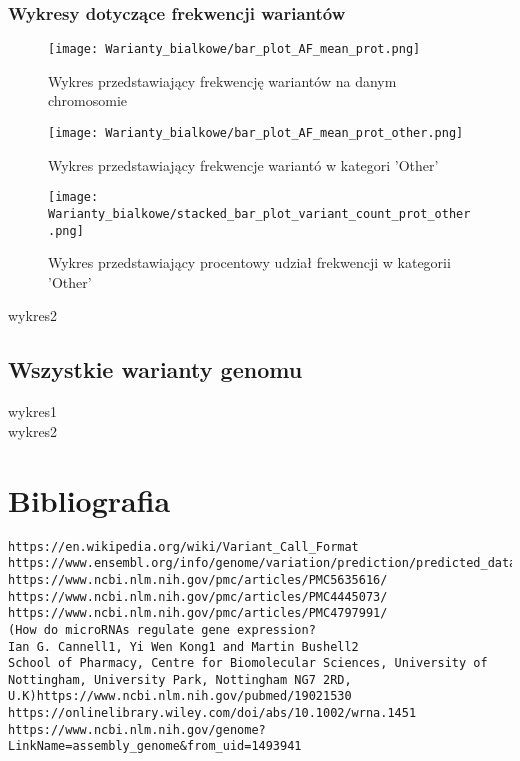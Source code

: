 \documentclass[12pt]{article}
\begin{document}
\subsubsection{Wykresy dotyczące frekwencji wariantów}
\begin{figure}[H]
    \texttt{[image: Warianty\_bialkowe/bar\_plot\_AF\_mean\_prot.png]}
    \caption{Wykres przedstawiający frekwencję wariantów na danym chromosomie}
\end{figure}
\begin{figure}[H]
    \texttt{[image: Warianty\_bialkowe/bar\_plot\_AF\_mean\_prot\_other.png]}
    \caption{Wykres przedstawiający frekwencje wariantó w kategori 'Other'}
\end{figure}
\begin{figure}[H]
    \texttt{[image: Warianty\_bialkowe/stacked\_bar\_plot\_variant\_count\_prot\_other.png]}
    \caption{Wykres przedstawiający procentowy udział frekwencji w kategorii 'Other'}
\end{figure}
wykres2 \\

\subsection{Wszystkie warianty genomu}
wykres1 \\
wykres2 \\

\newpage
\section{Bibliografia}

\begin{verbatim}
https://en.wikipedia.org/wiki/Variant_Call_Format
https://www.ensembl.org/info/genome/variation/prediction/predicted_data.html
https://www.ncbi.nlm.nih.gov/pmc/articles/PMC5635616/
https://www.ncbi.nlm.nih.gov/pmc/articles/PMC4445073/
https://www.ncbi.nlm.nih.gov/pmc/articles/PMC4797991/
(How do microRNAs regulate gene expression?
Ian G. Cannell1, Yi Wen Kong1 and Martin Bushell2
School of Pharmacy, Centre for Biomolecular Sciences, University of Nottingham, University Park, Nottingham NG7 2RD, U.K)https://www.ncbi.nlm.nih.gov/pubmed/19021530
https://onlinelibrary.wiley.com/doi/abs/10.1002/wrna.1451
https://www.ncbi.nlm.nih.gov/genome?LinkName=assembly_genome&from_uid=1493941
\end{verbatim}
\end{document}
